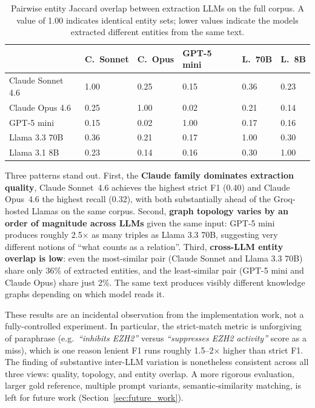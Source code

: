 \documentclass[12pt,a4paper,oneside]{report}
\begin{document}
\begin{table}[htbp]
\centering
\caption{Pairwise entity Jaccard overlap between extraction LLMs on the
full corpus. A value of 1.00 indicates identical entity sets; lower
values indicate the models extracted different entities from the same
text.}
\label{tab:empirical_jaccard}
\small
\begin{tabularx}{\textwidth}{@{}lXXXXX@{}}
\toprule
 & \textbf{C.\ Sonnet} & \textbf{C.\ Opus} & \textbf{GPT-5 mini} & \textbf{L.\ 70B} & \textbf{L.\ 8B} \\
\midrule
Claude Sonnet 4.6 & 1.00 & 0.25 & 0.15 & 0.36 & 0.23 \\
Claude Opus 4.6   & 0.25 & 1.00 & 0.02 & 0.21 & 0.14 \\
GPT-5 mini        & 0.15 & 0.02 & 1.00 & 0.17 & 0.16 \\
Llama 3.3 70B     & 0.36 & 0.21 & 0.17 & 1.00 & 0.30 \\
Llama 3.1 8B      & 0.23 & 0.14 & 0.16 & 0.30 & 1.00 \\
\bottomrule
\end{tabularx}
\end{table}

Three patterns stand out. First, the \textbf{Claude family dominates
extraction quality}, Claude Sonnet~4.6 achieves the highest strict F1
(0.40) and Claude Opus~4.6 the highest recall (0.32), with both
substantially ahead of the Groq-hosted Llamas on the same corpus.
Second, \textbf{graph topology varies by an order of magnitude across
LLMs} given the same input: GPT-5 mini produces roughly 2.5$\times$ as
many triples as Llama 3.3 70B, suggesting very different notions of
``what counts as a relation''. Third, \textbf{cross-LLM entity overlap
is low}: even the most-similar pair (Claude Sonnet and Llama 3.3 70B)
share only 36\% of extracted entities, and the least-similar pair (GPT-5
mini and Claude Opus) share just 2\%. The same text produces visibly
different knowledge graphs depending on which model reads it.

These results are an incidental observation from the implementation work,
not a fully-controlled experiment. In particular, the strict-match
metric is unforgiving of paraphrase (e.g.\ \emph{``inhibits EZH2''}
versus \emph{``suppresses EZH2 activity''} score as a miss), which is
one reason lenient F1 runs roughly 1.5--2$\times$ higher than strict F1.
The finding of substantive inter-LLM variation is nonetheless consistent
across all three views: quality, topology, and entity overlap. A more
rigorous evaluation, larger gold reference, multiple prompt variants,
semantic-similarity matching, is left for future work
(Section~\ref{sec:future_work}).
\end{document}
